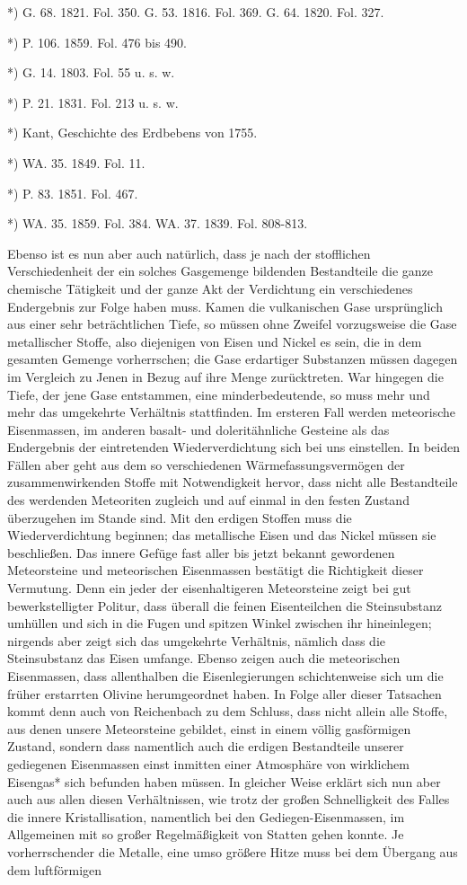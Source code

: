 \documentclass[a4paper, 11pt, oneside, polutonikogreek, german]{article}
\begin{document}
*) G. 68. 1821. Fol. 350. G. 53. 1816. Fol. 369. G. 64. 1820. Fol. 327.

*) P. 106. 1859. Fol. 476 bis 490.

*) G. 14. 1803. Fol. 55 u. s. w.

*) P. 21. 1831. Fol. 213 u. s. w.

*) Kant, Geschichte des Erdbebens von 1755.

*) WA. 35. 1849. Fol. 11.

*) P. 83. 1851. Fol. 467.

*) WA. 35. 1859. Fol. 384. WA. 37. 1839. Fol. 808-813.

Ebenso ist es nun aber auch natürlich, dass je nach der stofflichen Verschiedenheit der ein solches Gasgemenge bildenden Bestandteile die ganze chemische Tätigkeit und der ganze Akt der Verdichtung ein verschiedenes Endergebnis zur Folge haben muss. Kamen die vulkanischen Gase ursprünglich aus einer sehr beträchtlichen Tiefe, so müssen ohne Zweifel vorzugsweise die Gase metallischer Stoffe, also diejenigen von Eisen und Nickel es sein, die in dem gesamten Gemenge vorherrschen; die Gase erdartiger Substanzen müssen dagegen im Vergleich zu Jenen in Bezug auf ihre Menge zurücktreten. War hingegen die Tiefe, der jene Gase entstammen, eine minderbedeutende, so muss mehr und mehr das umgekehrte Verhältnis stattfinden. Im ersteren Fall werden meteorische Eisenmassen, im anderen basalt- und doleritähnliche Gesteine als das Endergebnis der eintretenden Wiederverdichtung sich bei uns einstellen. In beiden Fällen aber geht aus dem so verschiedenen Wärmefassungsvermögen der zusammenwirkenden Stoffe mit Notwendigkeit hervor, dass nicht alle Bestandteile des werdenden Meteoriten zugleich und auf einmal in den festen Zustand überzugehen im Stande sind. Mit den erdigen Stoffen muss die Wiederverdichtung beginnen; das metallische Eisen und das Nickel müssen sie beschließen. Das innere Gefüge fast aller bis jetzt bekannt gewordenen Meteorsteine und meteorischen Eisenmassen bestätigt die Richtigkeit dieser Vermutung. Denn ein jeder der eisenhaltigeren Meteorsteine zeigt bei gut bewerkstelligter Politur, dass überall die feinen Eisenteilchen die Steinsubstanz umhüllen und sich in die Fugen und spitzen Winkel zwischen ihr hineinlegen; nirgends aber zeigt sich das umgekehrte Verhältnis, nämlich dass die Steinsubstanz das Eisen umfange. Ebenso zeigen auch die meteorischen Eisenmassen, dass allenthalben die Eisenlegierungen schichtenweise sich um die früher erstarrten Olivine herumgeordnet haben. In Folge aller dieser Tatsachen kommt denn auch von Reichenbach zu dem Schluss, dass nicht allein alle Stoffe, aus denen unsere Meteorsteine gebildet, einst in einem völlig gasförmigen Zustand, sondern dass namentlich auch die erdigen Bestandteile unserer gediegenen Eisenmassen einst inmitten einer Atmosphäre von wirklichem Eisengas* sich befunden haben müssen. In gleicher Weise erklärt sich nun aber auch aus allen diesen Verhältnissen, wie trotz der großen Schnelligkeit des Falles die innere Kristallisation, namentlich bei den Gediegen-Eisenmassen, im Allgemeinen mit so großer Regelmäßigkeit von Statten gehen konnte. Je vorherrschender die Metalle, eine umso größere Hitze muss bei dem Übergang aus dem luftförmigen 
\end{document}
